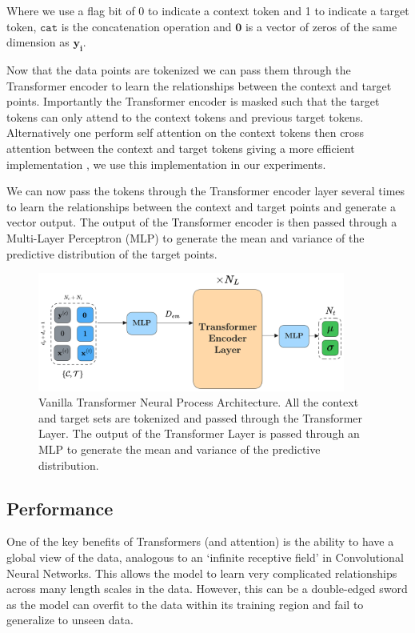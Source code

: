 \documentclass[../../main.tex]{subfiles}
\begin{document}
Where we use a flag bit of 0 to indicate a context token and 1 to indicate a target token, $\texttt{cat}$ is the concatenation operation and $\bm{0}$ is a vector of zeros of the same dimension as $\bm{y_i}$.

Now that the data points are tokenized we can pass them through the Transformer encoder to learn the relationships between the context and target points. Importantly the Transformer encoder is masked such that the target tokens can only attend to the context tokens and previous target tokens. Alternatively one perform self attention on the context tokens then cross attention between the context and target tokens giving a more efficient implementation \parencite{feng2022efficient}, we use this implementation in our experiments.

We can now pass the tokens through the Transformer encoder layer several times to learn the relationships between the context and target points and generate a vector output. The output of the Transformer encoder is then passed through a Multi-Layer Perceptron (MLP) to generate the mean and variance of the predictive distribution of the target points. 


\begin{figure}[H]
	\centering
	\includegraphics[width=0.9\textwidth]{./tnp.png}
	\caption{Vanilla Transformer Neural Process Architecture. All the context and target sets are tokenized and passed through the Transformer Layer. The output of the Transformer Layer is passed through an MLP to generate the mean and variance of the predictive distribution.}
	\label{fig:tnp}
\end{figure}

\subsection{Performance}

One of the key benefits of Transformers (and attention) is the ability to have a global view of the data, analogous to an `infinite receptive field' in Convolutional Neural Networks. This allows the model to learn very complicated relationships across many length scales in the data. However, this can be a double-edged sword as the model can overfit to the data within its training region and fail to generalize to unseen data. 
\end{document}
